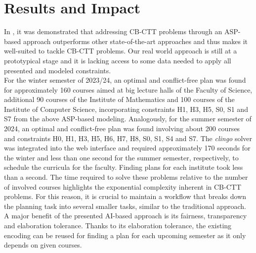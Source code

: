 \documentclass{easychair}
\newcommand{\CBCTT}{CB-CTT}
\newcommand{\ASP}{ASP}
\newcommand{\clingo}{\textit{clingo}}
\begin{document}
\section{Results and Impact}
\label{sec:impact}
  In \cite{bainkaokscsotawa18a}, it was demonstrated that addressing \CBCTT{} problems through an \ASP{}-based approach outperforms other state-of-the-art approaches and thus makes it well-suited to tackle \CBCTT{} problems. 
  Our real world approach is still at a prototypical stage and it is lacking access to some data needed to apply all presented and modeled constraints. \\
  For the winter semester of 2023/24, an optimal and conflict-free plan was found for approximately 160 courses aimed at big lecture halls of the Faculty of Science, additional 90 courses of the Institute of Mathematics and 100 courses of the Institute of Computer Science, incorporating constraints H1, H3, H5, S0, S1 and S7 from the above \ASP{}-based modeling. 
  Analogously, for the summer semester of 2024, an optimal and conflict-free plan was found involving about 200 courses and constraints H0, H1, H3, H5, H6, H7, H8, S0, S1, S4 and S7.  
  The \clingo{} solver was integrated into the web interface and required approximately  170 seconds for the winter and less than one second for the summer semester, respectively, to schedule the curricula for the faculty. 
  Finding plans for each institute took less than a second. 
  The time required to solve these problems relative to the number of involved courses highlights the exponential complexity inherent in \CBCTT{} problems. 
  For this reason, it is crucial to maintain a workflow that breaks down the planning task into several smaller tasks, similar to the traditional approach. \\
  A major benefit of the presented AI-based approach is its fairness, transparency and elaboration tolerance. 
  Thanks to its elaboration tolerance, the existing encoding can be reused for finding a plan for each upcoming semester as it only depends on given courses. 
\end{document}
